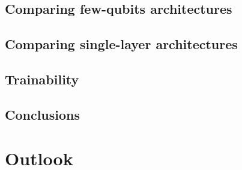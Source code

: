 \subsection{Comparing few-qubits architectures}


\subsection{Comparing single-layer architectures}


\subsection{Trainability}


\subsection{Conclusions}


\section{Outlook}



